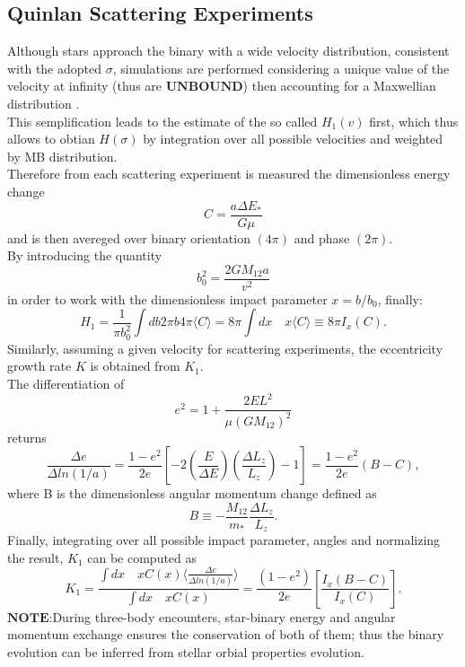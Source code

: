 \documentclass[12pt,twoside,openany]{book}
\begin{document}
\subsection{Quinlan Scattering Experiments}
Although stars approach the binary with a wide velocity distribution, consistent with the adopted $\sigma$, simulations are performed considering a unique value of the velocity at infinity (thus are $\mathbf{UNBOUND}$) then accounting for a Maxwellian distribution \cite{Quinlan_1996}.\\This semplification leads to the estimate of the so called $H_1(v)$ first, which thus allows to obtian $H(\sigma)$ by integration over all possible velocities and weighted by MB distribution.\\Therefore from each scattering experiment is measured the dimensionless energy change 
\begin{equation}\label{C quinlan}
    C=\frac{a\Delta E_*}{G\mu}
\end{equation}
and is then avereged over binary orientation $(4\pi)$ and phase $(2\pi)$.\\By introducing the quantity
\begin{equation}
    b_0^2=\frac{2GM_{12}a}{v^2}
\end{equation}
in order to work with the dimensionless impact parameter $x=b/b_0$, finally:
\begin{equation}
    H_1=\frac{1}{\pi b_0^2}\int db2\pi b 4 \pi \langle C\rangle=8 \pi \int dx\quad x \langle C\rangle\equiv8\pi I_x(C).
\end{equation}
Similarly, assuming a given velocity for scattering experiments, the eccentricity growth rate $K$ is obtained from $K_1$.\\The differentiation of
\begin{equation}
    e^2=1+\frac{2EL^2}{\mu(GM_{12})^2}
\end{equation}
returns
\begin{equation}
    \frac{\Delta e}{\Delta ln(1/a)}=\frac{1-e^2}{2e}\left[-2\left(\frac{E}{\Delta E}\right)\left(\frac{\Delta L_z}{L_z}\right)-1\right]=\frac{1-e^2}{2e}(B-C),
\end{equation}
where B is the dimensionless angular momentum change defined as 
\begin{equation}\label{B quinlan}
    B\equiv-\frac{M_{12}}{m_*}\frac{\Delta L_z}{L_z}.
\end{equation}
Finally, integrating over all possible impact parameter, angles and normalizing the result, $K_1$ can be computed as
\begin{equation}
    K_1=\frac{\int dx\quad xC(x)\langle \frac{\Delta e}{\Delta ln(1/a)}\rangle}{\int dx\quad xC(x)}=\frac{(1-e^2)}{2e}\left[\frac{I_x(B-C)}{I_x(C)}\right].
\end{equation}
$\mathbf{NOTE}$:During three-body encounters, star-binary energy and angular momentum exchange ensures the conservation of both of them; thus the binary evolution can be inferred from stellar orbial properties evolution.
\end{document}
